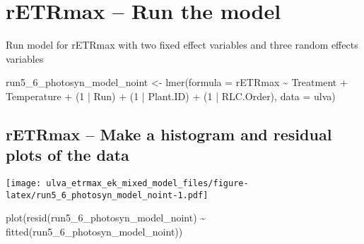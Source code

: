 \documentclass[
]{article}
\newenvironment{Shaded}{\begin{snugshade}}{\end{snugshade}}
\newcommand{\AttributeTok}[1]{\textcolor[rgb]{0.77,0.63,0.00}{#1}}
\newcommand{\ConstantTok}[1]{\textcolor[rgb]{0.00,0.00,0.00}{#1}}
\newcommand{\DecValTok}[1]{\textcolor[rgb]{0.00,0.00,0.81}{#1}}
\newcommand{\FunctionTok}[1]{\textcolor[rgb]{0.00,0.00,0.00}{#1}}
\newcommand{\NormalTok}[1]{#1}
\newcommand{\OtherTok}[1]{\textcolor[rgb]{0.56,0.35,0.01}{#1}}
\newcommand{\SpecialCharTok}[1]{\textcolor[rgb]{0.00,0.00,0.00}{#1}}
\newcommand{\StringTok}[1]{\textcolor[rgb]{0.31,0.60,0.02}{#1}}
\begin{document}
\hypertarget{retrmax-run-the-model}{%
\section{rETRmax -- Run the model}\label{retrmax-run-the-model}}

Run model for rETRmax with two fixed effect variables and three random
effects variables

\begin{Shaded}
\begin{Highlighting}[]
\NormalTok{run5\_6\_photosyn\_model\_noint }\OtherTok{\textless{}{-}} \FunctionTok{lmer}\NormalTok{(}\AttributeTok{formula =}\NormalTok{ rETRmax }\SpecialCharTok{\textasciitilde{}}\NormalTok{ Treatment }\SpecialCharTok{+}\NormalTok{ Temperature }
                                    \SpecialCharTok{+}\NormalTok{ (}\DecValTok{1} \SpecialCharTok{|}\NormalTok{ Run) }\SpecialCharTok{+}\NormalTok{ (}\DecValTok{1} \SpecialCharTok{|}\NormalTok{ Plant.ID) }\SpecialCharTok{+}\NormalTok{ (}\DecValTok{1} \SpecialCharTok{|}\NormalTok{ RLC.Order), }
                                    \AttributeTok{data =}\NormalTok{ ulva)}
\end{Highlighting}
\end{Shaded}

\hypertarget{retrmax-make-a-histogram-and-residual-plots-of-the-data}{%
\subsection{rETRmax -- Make a histogram and residual plots of the
data}\label{retrmax-make-a-histogram-and-residual-plots-of-the-data}}

\begin{Shaded}
\end{Shaded}

\texttt{[image: ulva\_etrmax\_ek\_mixed\_model\_files/figure-latex/run5\_6\_photosyn\_model\_noint-1.pdf]}

\begin{Shaded}
\begin{Highlighting}[]
\FunctionTok{plot}\NormalTok{(}\FunctionTok{resid}\NormalTok{(run5\_6\_photosyn\_model\_noint) }\SpecialCharTok{\textasciitilde{}} \FunctionTok{fitted}\NormalTok{(run5\_6\_photosyn\_model\_noint))}
\end{Highlighting}
\end{Shaded}
\end{document}
